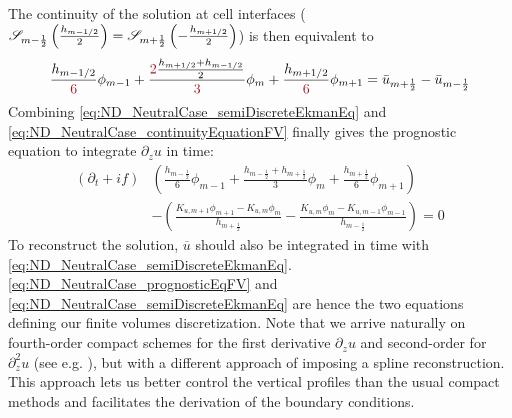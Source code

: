 The continuity of the solution at cell interfaces (${\cal S}_{m-\frac{1}{2}}\left(\frac{h_{m-1/2}}{2}\right) = {\cal S}_{m+\frac{1}{2}}\left(-\frac{h_{m+1/2}}{2}\right)$) is then equivalent to
%
\begin{equation}
\label{eq:ND_NeutralCase_continuityEquationFV}
	\frac{h_{m-1/2}}{\emphase{6}} \phi_{m-1} 
	+ \frac{\emphase{2}\frac{h_{m+1/2}+h_{m-1/2}}{2}}
		{\emphase{3}} \phi_m  
	+ \frac{h_{m+1/2}}{\emphase{6}} \phi_{m+1} = \Bar{u}_{m+\frac{1}{2}} - \Bar{u}_{m-\frac{1}{2}}
\end{equation}
Combining \eqref{eq:ND_NeutralCase_semiDiscreteEkmanEq}
and \eqref{eq:ND_NeutralCase_continuityEquationFV} finally gives
the prognostic equation to integrate
$\partial_z u$ in time:
\begin{equation}
\begin{aligned}
\label{eq:ND_NeutralCase_prognosticEqFV}
	(\partial_t + if) &\left( \frac{h_{m-\frac{1}{2}}}{6}
				\phi_{m-1}
	+ \frac{h_{m-\frac{1}{2}} + h_{m+\frac{1}{2}}}{3} \phi_m
	+ \frac{h_{m+\frac{1}{2}}}{6} \phi_{m+1} \right) \\
	&-
    \left(
	\frac{K_{u, m+1}\phi_{m+1} - K_{u, m}\phi_{m}}{ h_{m+\frac{1}{2}}} -
	\frac{K_{u, m}\phi_{m} - K_{u,m-1}\phi_{m-1}}{h_{m-\frac{1}{2}}}
    \right)
= 0
\end{aligned}
\end{equation}
To reconstruct the solution, $\overline{u}$ should also be 
integrated in time with \eqref{eq:ND_NeutralCase_semiDiscreteEkmanEq}.
\eqref{eq:ND_NeutralCase_prognosticEqFV} and
\eqref{eq:ND_NeutralCase_semiDiscreteEkmanEq} are hence the two 
equations defining our finite volumes discretization.
Note that we arrive naturally on fourth-order compact schemes for
the first derivative $\partial_z u$ and second-order for
$\partial_z^2 u$ (see e.g. \cite{piller_finite-volume_2004}),
but with a different approach of imposing a spline reconstruction.
This approach lets us better control the vertical profiles
than the usual compact methods and
facilitates the derivation of the boundary conditions.
